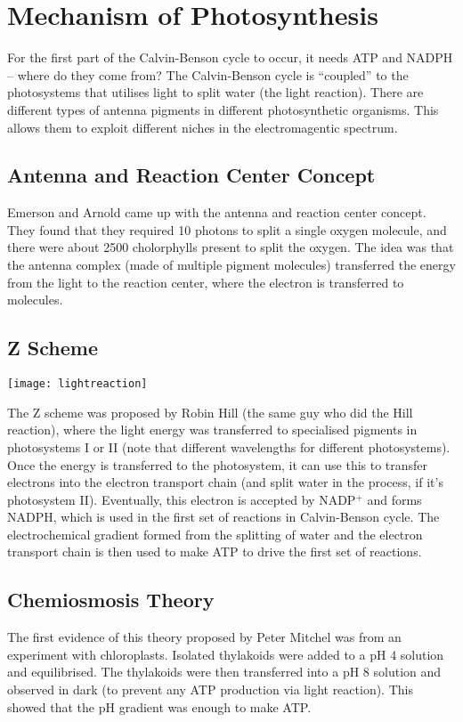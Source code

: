 \section{Mechanism of Photosynthesis}

For the first part of the Calvin-Benson cycle to occur, it needs ATP and NADPH -- where do they come from?
The Calvin-Benson cycle is ``coupled'' to the photosystems that utilises light to split water (the light reaction).
There are different types of antenna pigments in different photosynthetic organisms.
This allows them to exploit different niches in the electromagentic spectrum.

\subsection{Antenna and Reaction Center Concept}

Emerson and Arnold came up with the antenna and reaction center concept.
They found that they required 10 photons to split a single oxygen molecule, and there were about 2500 cholorphylls present to split the oxygen.
The idea was that the antenna complex (made of multiple pigment molecules) transferred the energy from the light to the reaction center, where the electron is transferred to molecules.

\subsection{Z Scheme}

\begin{center}
\texttt{[image: lightreaction]}
\end{center}

The Z scheme was proposed by Robin Hill (the same guy who did the Hill reaction), where the light energy was transferred to specialised pigments in photosystems I or II (note that different wavelengths for different photosystems).
Once the energy is transferred to the photosystem, it can use this to transfer electrons into the electron transport chain (and split water in the process, if it's photosystem II).
Eventually, this electron is accepted by NADP$^+$ and forms NADPH, which is used in the first set of reactions in Calvin-Benson cycle.
The electrochemical gradient formed from the splitting of water and the electron transport chain is then used to make ATP to drive the first set of reactions.

\subsection{Chemiosmosis Theory}

The first evidence of this theory proposed by Peter Mitchel was from an experiment with chloroplasts.
Isolated thylakoids were added to a pH 4 solution and equilibrised.
The thylakoids were then transferred into a pH 8 solution and observed in dark (to prevent any ATP production via light reaction).
This showed that the pH gradient was enough to make ATP.

